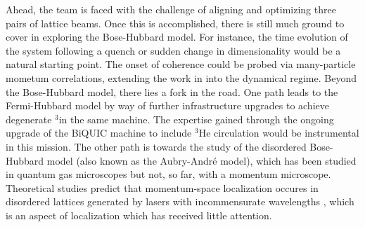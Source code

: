 	Ahead, the team is faced with the challenge of aligning and optimizing three pairs of lattice beams.
	Once this is accomplished, there is still much ground to cover in exploring the Bose-Hubbard model.
	For instance, the time evolution of the system following a quench or sudden change in dimensionality would be a natural starting point.
	The onset of coherence could be probed via many-particle mometum correlations, extending the work in \cite{Carcy19} into the dynamical regime.	
	Beyond the Bose-Hubbard model, there lies a fork in the road.
	One path leads to the Fermi-Hubbard model by way of further infrastructure upgrades to achieve degenerate $^3$\mhe in the same machine.
	The expertise gained through the ongoing upgrade of the BiQUIC machine to include $^3$He circulation would be instrumental in this mission.
	The other path is towards the study of the disordered Bose-Hubbard model (also known as the Aubry-Andr\'{e} model), which has been studied in quantum gas microscopes \cite{Rispoli19} but not, so far, with a momentum microscope.
	Theoretical studies predict that momentum-space localization occures in disordered lattices generated by lasers with incommensurate wavelengths \cite{Larcher11}, which is an aspect of localization which has received little attention.
	
	









